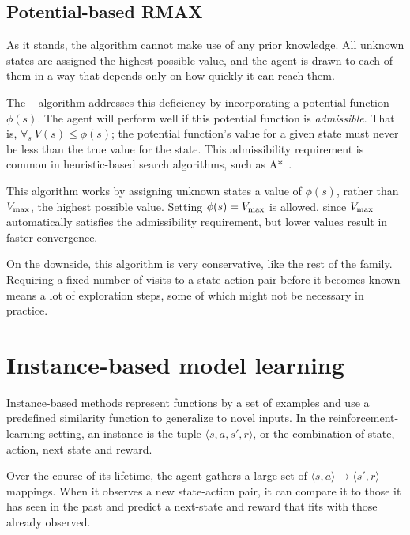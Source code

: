 \subsection{Potential-based RMAX}


As it stands, the  algorithm cannot make use of any prior knowledge. All unknown states are assigned the highest possible value, and the agent is drawn to each of them in a way that depends only on how quickly it can reach them.

The ~\cite{asmuth08} algorithm addresses this deficiency by incorporating a potential function $\phi(s)$. The agent will perform well if this potential function is \emph{admissible}. That is, $\forall_s ~ V(s) \leq \phi(s)$; the potential function's value for a given state must never be less than the true value for the state. This admissibility requirement is common in heuristic-based search algorithms, such as A*~\cite{russell1995artificial}.

This algorithm works by assigning unknown states a value of $\phi(s)$, rather than $V_{\rm max}$, the highest possible value. Setting $\phi(s)=V_{\rm max}$ is allowed, since $V_{\rm max}$ automatically satisfies the admissibility requirement, but lower values result in faster convergence.

On the downside, this algorithm is very conservative, like the rest of the  family. Requiring a fixed number of visits to a state-action pair before it becomes known means a lot of exploration steps, some of which might not be necessary in practice.




\section{Instance-based model learning}

Instance-based methods represent functions by a set of examples and use a predefined similarity function to generalize to novel inputs. In the reinforcement-learning setting, an instance is the tuple $\langle s, a, s', r \rangle$, or the combination of state, action, next state and reward.

Over the course of its lifetime, the agent gathers a large set of $\langle s, a\rangle \rightarrow \langle s', r \rangle$ mappings. When it observes a new state-action pair, it can compare it to those it has seen in the past and predict a next-state and reward that fits with those already observed.

